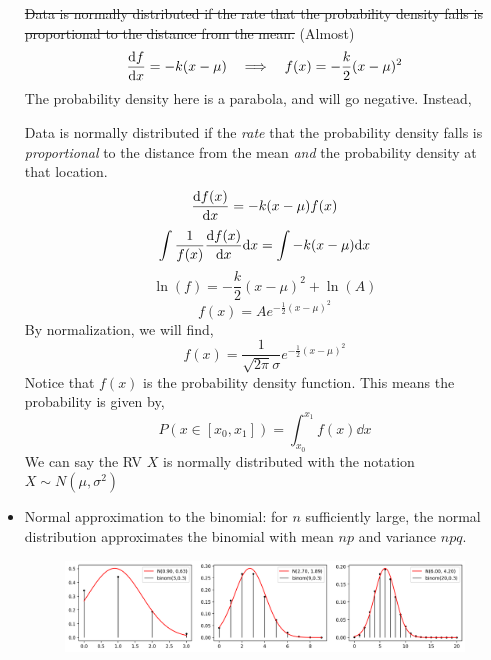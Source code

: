 \documentclass[12pt]{article}
\numberwithin{equation}{section}
\begin{document}
\begin{itemize}
\st{Data is normally distributed if the rate that the probability density falls is proportional to the distance from the mean.} (Almost)
\begin{equation}
		\dv{f}{x} = -k(x-\mu)\quad \Longrightarrow\quad f(x) = -\frac{k}{2}(x-\mu)^2
\end{equation}
The probability density here is a parabola, and will go negative. Instead,

Data is normally distributed if the \textit{rate} that the probability density falls is \textit{proportional} to the distance from the mean \textit{and} the probability density at that location.
\begin{equation}
		\dv{f(x)}{x} = -k(x-\mu) f(x)
\end{equation}
\begin{equation}
		\int \frac{1}{f(x)}	\dv{f(x)}{x}\dd x = \int -k(x-\mu) \dd x
\end{equation}
\begin{equation}
		\ln(f) = -\frac{k}{2}(x-\mu)^2 + \ln(A)
\end{equation}
\begin{equation}
		f(x) = Ae^{-\frac{1}{2}(x-\mu)^2}
\end{equation}
By normalization, we will find,
\begin{equation}
		f(x) = \frac{1}{\sqrt{2\pi}\sigma}e^{-\frac{1}{2}(x-\mu)^2}
\end{equation}
Notice that $ f(x) $ is the probability density function. This means the probability is given by,
\begin{equation}
		P(x\in[x_0, x_1]) = \int_{x_0}^{x_1} f(x)\dd x
\end{equation}
We can say the RV $ X $ is normally distributed with the notation $ X\sim N(\mu, \sigma^2) $
\item Normal approximation to the binomial: for $ n $ sufficiently large, the normal distribution approximates the binomial with mean $ np $ and variance $ npq $.

\begin{figure}[H]
	\centering
	\includegraphics[width=16cm] {binom}
\end{figure}


\end{itemize}
\end{document}
